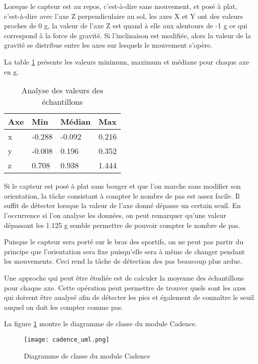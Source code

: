 Lorsque le capteur est au repos, c'est-à-dire sans mouvement, et posé à plat, c'est-à-dire avec l'axe Z perpendiculaire au sol, les axes X et Y ont des valeurs proches de 0 g, la valeur de l'axe Z est quand à elle aux alentours de -1 g ce qui correspond à la force de gravité. Si l'inclinaison est modifiée, alors la valeur de la gravité se distribue entre les axes sur lesquels le mouvement s'opère.

La table \ref{tab:analysis_samples} présente les valeurs minimum, maximum et médiane pour chaque axe en g.

\begin{table}[htb]
\caption{Analyse des valeurs des échantillons}
\label{tab:analysis_samples}
\centering
\begin{tabular}{ l l l l }
\toprule
Axe & Min & Médian & Max \\
\midrule
x & -0.288 & -0.092 & 0.216 \\
y & -0.008 & 0.196 & 0.352 \\
z & 0.708 & 0.938 & 1.444 \\
\bottomrule 
\end{tabular}
\end{table}

Si le capteur est posé à plat sans bouger et que l'on marche sans modifier son orientation, la tâche consistant à compter le nombre de pas est assez facile. Il suffit de détecter lorsque la valeur de l'axe donné dépasse un certain seuil. En l'occurrence si l'on analyse les données, on peut remarquer qu'une valeur dépassant les 1.125 g semble permettre de pouvoir compter le nombre de pas.

Puisque le capteur sera porté sur le bras des sportifs, on ne peut pas partir du principe que l'orientation sera fixe puisqu'elle sera à même de changer pendant les mouvements. Ceci rend la tâche de détection des pas beaucoup plus ardue.

Une approche qui peut être étudiée est de calculer la moyenne des échantillons pour chaque axe. Cette opération peut permettre de trouver quels sont les axes qui doivent être analysé afin de détecter les pics et également de connaître le seuil auquel on doit les compter comme pas.

La figure \ref{fig:cadence_uml} montre le diagramme de classe du module Cadence.

\begin{figure}[htb]
\centering 
\texttt{[image: cadence\_uml.png]} 
\caption{Diagramme de classe du module Cadence}
\label{fig:cadence_uml}
\end{figure}

